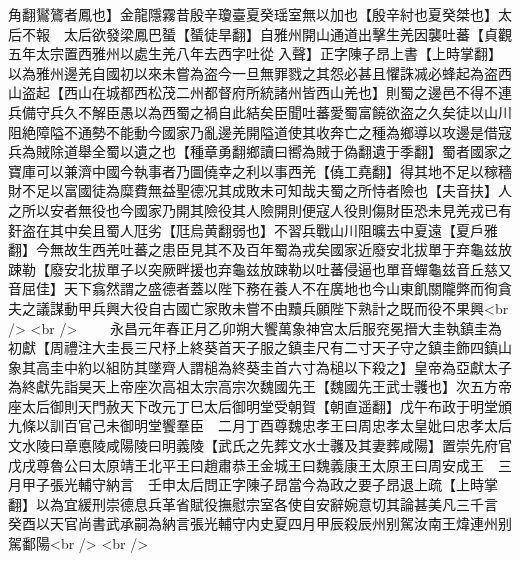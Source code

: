 角翻鸑鷟者鳳也】金龍隱霧昔殷辛瓊臺夏癸瑶室無以加也【殷辛紂也夏癸桀也】太后不報　太后欲發梁鳳巴蜑【蜑徒旱翻】自雅州開山通道出擊生羌因襲吐蕃【貞觀五年太宗置西雅州以處生羌八年去西字吐從入聲】正字陳子昂上書【上時掌翻】以為雅州邊羌自國初以來未嘗為盗今一旦無罪戮之其怨必甚且懼誅㓕必蜂起為盗西山盗起【西山在城都西松茂二州都督府所統諸州皆西山羌也】則蜀之邊邑不得不連兵備守兵久不解臣愚以為西蜀之禍自此結矣臣聞吐蕃愛蜀富饒欲盗之久矣徒以山川阻絶障隘不通勢不能動今國家乃亂邊羌開隘道使其收奔亡之種為鄉導以攻邊是借寇兵為賊除道舉全蜀以遺之也【種章勇翻鄉讀曰嚮為賊于偽翻遺于季翻】蜀者國家之寶庫可以兼濟中國今執事者乃圖僥幸之利以事西羌【僥工堯翻】得其地不足以稼穡財不足以富國徒為糜費無益聖德况其成敗未可知哉夫蜀之所恃者險也【夫音扶】人之所以安者無役也今國家乃開其險役其人險開則便寇人役則傷財臣恐未見羌戎已有姧盗在其中矣且蜀人尫劣【尫烏黄翻弱也】不習兵戰山川阻曠去中夏遠【夏戶雅翻】今無故生西羌吐蕃之患臣見其不及百年蜀為戎矣國家近廢安北拔單于弃龜兹放踈勒【廢安北拔單子以突厥畔援也弃龜兹放踈勒以吐蕃侵逼也單音蟬龜兹音丘慈又音屈佳】天下翕然謂之盛德者蓋以陛下務在養人不在廣地也今山東飢關隴弊而徇貪夫之議謀動甲兵興大役自古國亡家敗未嘗不由黷兵願陛下熟計之既而役不果興<br />
<br />
　　永昌元年春正月乙卯朔大饗萬象神宫太后服兖冕搢大圭執鎮圭為初獻【周禮注大圭長三尺杼上終葵首天子服之鎮圭尺有二寸天子守之鎮圭飾四鎮山象其高圭中約以組防其墜齊人謂槌為終葵圭首六寸為槌以下殺之】皇帝為亞獻太子為終獻先詣昊天上帝座次高祖太宗高宗次魏國先王【魏國先王武士彠也】次五方帝座太后御則天門赦天下改元丁巳太后御明堂受朝賀【朝直遥翻】戊午布政于明堂頒九條以訓百官己未御明堂饗羣臣　二月丁酉尊魏忠孝王曰周忠孝太皇妣曰忠孝太后文水陵曰章悳陵咸陽陵曰明義陵【武氏之先葬文水士彠及其妻葬咸陽】置崇先府官戊戌尊魯公曰太原靖王北平王曰趙肅恭王金城王曰魏義康王太原王曰周安成王　三月甲子張光輔守納言　壬申太后問正字陳子昂當今為政之要子昂退上疏【上時掌翻】以為宜緩刑崇德息兵革省賦役撫慰宗室各使自安辭婉意切其論甚美凡三千言　癸酉以天官尚書武承嗣為納言張光輔守内史夏四月甲辰殺辰州别駕汝南王煒連州别駕鄱陽<br />
<br />
